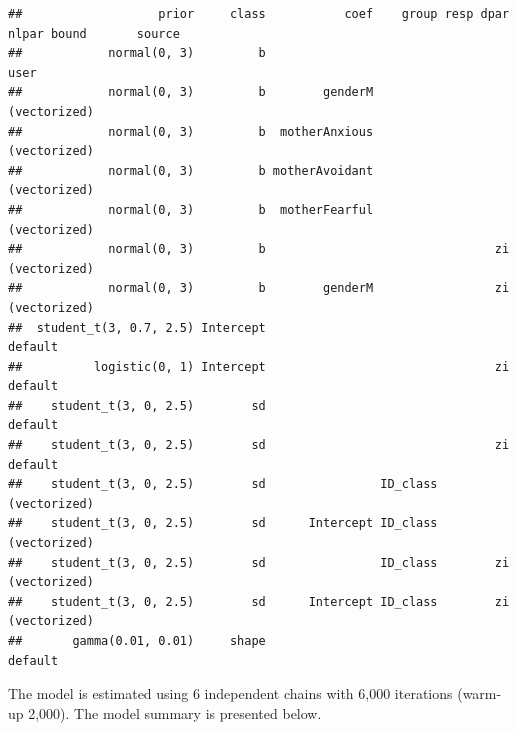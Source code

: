 \documentclass[
]{book}
\begin{document}
\begin{verbatim}
##                   prior     class           coef    group resp dpar nlpar bound       source
##            normal(0, 3)         b                                                       user
##            normal(0, 3)         b        genderM                                (vectorized)
##            normal(0, 3)         b  motherAnxious                                (vectorized)
##            normal(0, 3)         b motherAvoidant                                (vectorized)
##            normal(0, 3)         b  motherFearful                                (vectorized)
##            normal(0, 3)         b                                zi             (vectorized)
##            normal(0, 3)         b        genderM                 zi             (vectorized)
##  student_t(3, 0.7, 2.5) Intercept                                                    default
##          logistic(0, 1) Intercept                                zi                  default
##    student_t(3, 0, 2.5)        sd                                                    default
##    student_t(3, 0, 2.5)        sd                                zi                  default
##    student_t(3, 0, 2.5)        sd                ID_class                       (vectorized)
##    student_t(3, 0, 2.5)        sd      Intercept ID_class                       (vectorized)
##    student_t(3, 0, 2.5)        sd                ID_class        zi             (vectorized)
##    student_t(3, 0, 2.5)        sd      Intercept ID_class        zi             (vectorized)
##       gamma(0.01, 0.01)     shape                                                    default
\end{verbatim}

The model is estimated using 6 independent chains with 6,000 iterations (warm-up 2,000). The model summary is presented below.
\end{document}
